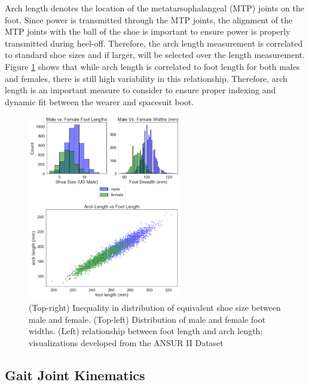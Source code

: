 \documentclass[defaultstyle,11pt]{comps}
\begin{document}
Arch length denotes the location of the metatarsophalangeal (MTP) joints on the foot.
Since power is transmitted through the MTP joints, the alignment of the MTP joints with the ball of the shoe is important to ensure power is properly transmitted during heel-off.
Therefore, the arch length measurement is correlated to standard shoe sizes and if larger, will be selected over the length measurement.
Figure \ref{fig:SA3-ANSUR} shows that while arch length is correlated to foot length for both males and females, there is still high variability in this relationship.
Therefore, arch length is an important measure to consider to ensure proper indexing and dynamic fit between the wearer and spacesuit boot.

\begin{figure}
\hypertarget{fig:SA3-ANSUR}{%
\centering
\includegraphics[width=0.6\textwidth,height=\textheight]{../fig/SA3/ANSUR.png}
\caption{(Top-right) Inequality in distribution of equivalent shoe size between male and female. (Top-left) Distribution of male and female foot widths. (Left) relationship between foot length and arch length; visualizations developed from the ANSUR II Dataset}\label{fig:SA3-ANSUR}
}
\end{figure}

\hypertarget{gait-joint-kinematics}{%
\subsection{Gait Joint Kinematics}\label{gait-joint-kinematics}}
\end{document}
